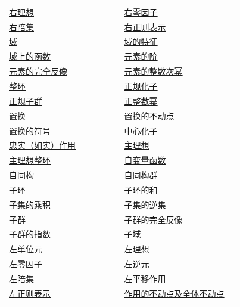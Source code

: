 \begin{longtable}{@{}>{\raggedright\arraybackslash}p{0.47\linewidth}>{\raggedright\arraybackslash}p{0.47\linewidth}@{}}
\hyperref[p2:concept:c1-l1202]{右理想} & \hyperref[p2:concept:c1-l989]{右零因子}\\
\hyperref[p2:concept:c1-l311]{右陪集} & \hyperref[p2:concept:c1-l468]{右正则表示}\\
\hyperref[p2:concept:c1-l1035]{域} & \hyperref[p2:concept:c1-l1442]{域的特征}\\
\hyperref[p2:concept:c3-functions]{域上的函数} & \hyperref[p2:concept:c1-l354]{元素的阶}\\
\hyperref[p2:concept:c1-l488]{元素的完全反像} & \hyperref[p2:concept:c1-l105]{元素的整数次幂}\\
\hyperref[p2:concept:c1-l990]{整环} & \hyperref[p2:concept:c2-l1208]{正规化子}\\
\hyperref[p2:concept:c1-l574]{正规子群} & \hyperref[p2:concept:c1-l830]{正整数幂}\\
\hyperref[p2:concept:c1-l194]{置换} & \hyperref[p2:concept:c2-l405]{置换的不动点}\\
\hyperref[p2:concept:c1-l284]{置换的符号} & \hyperref[p2:concept:c2-l1162]{中心化子}\\
\hyperref[p2:concept:c2-l1001]{忠实（如实）作用} & \hyperref[p2:concept:c3-generated-ideal]{主理想}\\
\hyperref[p2:concept:c3-pid]{主理想整环} & \hyperref[p2:concept:c3-functions]{自变量函数}\\
\hyperref[p2:concept:c2-l718]{自同构} & \hyperref[p2:concept:c2-l722]{自同构群}\\
\hyperref[p2:concept:c1-l887]{子环} & \hyperref[p2:concept:c3-subring-sum]{子环的和}\\
\hyperref[p2:concept:c1-l613]{子集的乘积} & \hyperref[p2:concept:c1-l613]{子集的逆集}\\
\hyperref[p2:concept:c1-l247]{子群} & \hyperref[p2:concept:c2-l12]{子群的完全反像}\\
\hyperref[p2:concept:c1-l312]{子群的指数} & \hyperref[p2:concept:c1-l1039]{子域}\\
\hyperref[p2:concept:c1-l55]{左单位元} & \hyperref[p2:concept:c1-l1202]{左理想}\\
\hyperref[p2:concept:c1-l988]{左零因子} & \hyperref[p2:concept:c1-l56]{左逆元}\\
\hyperref[p2:concept:c1-l311]{左陪集} & \hyperref[p2:concept:c2-l963]{左平移作用}\\
\hyperref[p2:concept:c1-l468]{左正则表示} & \hyperref[p2:concept:c2-l1035]{作用的不动点及全体不动点}\\
\end{longtable}
\endgroup
